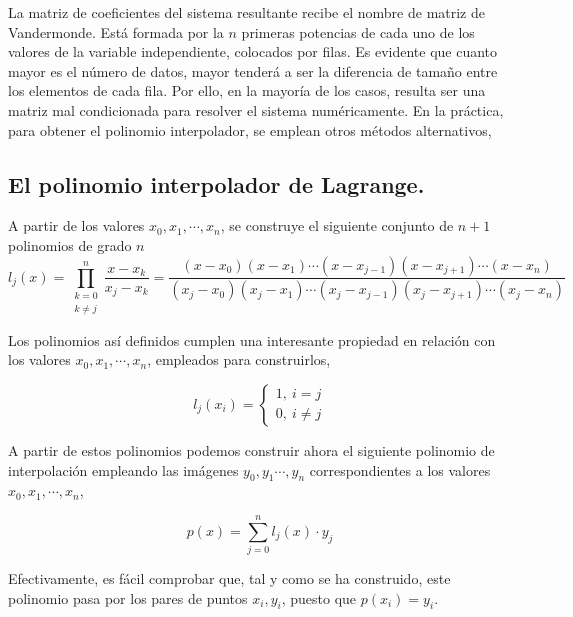 La matriz de coeficientes del sistema resultante recibe el nombre de matriz de Vandermonde. Está formada por la $n$ primeras potencias de cada uno de los valores de la variable independiente, colocados por filas. Es evidente que cuanto mayor es el número de datos, mayor tenderá a ser la diferencia de tamaño entre los elementos de cada fila. Por ello, en la mayoría de los casos, resulta ser una matriz mal condicionada para resolver el sistema numéricamente. En la práctica, para obtener el polinomio interpolador, se emplean otros métodos alternativos,

\subsection{El polinomio interpolador de Lagrange.} \label{sec:lagranje} 

A partir de los valores $x_0, x_1,\cdots, x_n$, se construye el siguiente conjunto de $n+1$ polinomios de grado $n$
\begin{equation*}
l_j(x)=\prod_{\substack{k=0\\
k\neq j}}^n\frac{x-x_k}{x_j-x_k}=\frac{(x-x_0)(x-x_1)\cdots(x-x_{j-1})(x-x_{j+1})\cdots(x-x_n)}{(x_j-x_0)(x_j-x_1)\cdots(x_j-x_{j-1})(x_j-x_{j+1})\cdots(x_j-x_n)}
\end{equation*}

Los polinomios así definidos cumplen una interesante propiedad en  relación con los valores $x_0, x_1,\cdots, x_n$, empleados para construirlos,

\begin{equation*}
l_j(x_i)= \left\{ 
\begin{aligned}
1,\ i=j\\
0,\ i\neq j
\end{aligned}
\right.
\end{equation*}

A partir de estos polinomios podemos construir ahora el siguiente polinomio de interpolación empleando las imágenes $y_0,y_1\cdots, y_n$ correspondientes a los valores $x_0, x_1,\cdots, x_n$,

\begin{equation*}
p(x)=\sum_{j=0}^n l_j(x)\cdot y_j
\end{equation*}

Efectivamente, es fácil comprobar que, tal y como se ha construido, este polinomio pasa por los pares de puntos $x_i,y_i$, puesto que $p(x_i)=y_i$.

